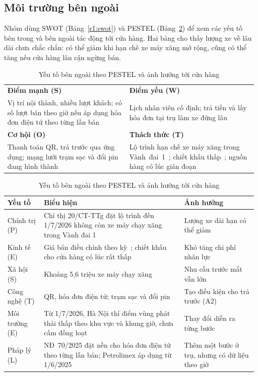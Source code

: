\subsection{Môi trường bên ngoài}
\label{r1:env}
\noindent
Nhóm dùng SWOT (Bảng~\ref{r1:swot}) và PESTEL (Bảng~\ref{r1:pestel}) để xem các yếu tố bên trong và bên ngoài tác động tới cửa hàng.
Hai bảng cho thấy lượng xe về lâu dài chưa chắc chắn: có thể giảm khi hạn chế xe máy xăng mở rộng, cũng có thể tăng nếu cửa hàng lân cận ngừng bán. 

\begin{table}[!htbp]\centering\small
\caption{SWOT của cửa hàng xăng nội thành}\label{r1:swot}
\begin{tabularx}{\linewidth}{@{}>{\raggedright\arraybackslash}X >{\raggedright\arraybackslash}X@{}}
\toprule
\textbf{Điểm mạnh (S)} & \textbf{Điểm yếu (W)} \\
Vị trí nội thành, nhiều lượt khách; có số lượt bán theo giờ nếu áp dụng hóa đơn điện tử theo từng lần bán~\cite{nd70} &
Lịch nhân viên cố định; trả tiền và lấy hóa đơn tại trụ làm xe đứng lâu \\
\midrule
\textbf{Cơ hội (O)} & \textbf{Thách thức (T)} \\
Thanh toán QR, trả trước qua ứng dụng; mạng lưới trạm sạc và đổi pin đang hình thành~\cite{vgx} &
Lộ trình hạn chế xe máy xăng trong Vành~đai~1~\cite{ct20,lez2026}; chiết khấu thấp~\cite{chietkhau}; nguồn hàng có lúc gián đoạn~\cite{vtc2026} \\
\bottomrule
\end{tabularx}
\vspace{1em}
\caption{Yếu tố bên ngoài theo PESTEL và ảnh hưởng tới cửa hàng}\label{r1:pestel}
\begin{tabularx}{\linewidth}{@{}p{24mm} >{\raggedright\arraybackslash}X >{\raggedright\arraybackslash}p{50mm}@{}}
\toprule
\textbf{Yếu tố} & \textbf{Biểu hiện} & \textbf{Ảnh hưởng} \\
\midrule
Chính trị (P) & Chỉ thị 20/CT-TTg đặt lộ trình đến 1/7/2026 không còn xe máy chạy xăng trong Vành đai 1~\cite{ct20} & Lượng xe dài hạn có thể giảm \\
Kinh tế (E) & Giá bán điều chỉnh theo kỳ~\cite{moit2026}; chiết khấu cho cửa hàng có lúc rất thấp~\cite{chietkhau} & Khó tăng chi phí nhân lực \\
Xã hội (S) & Khoảng 5,6 triệu xe máy chạy xăng~\cite{vnex2025} & Nhu cầu trước mắt vẫn lớn \\
Công nghệ (T) & QR, hóa đơn điện tử; trạm sạc và đổi pin~\cite{vgx} & Tạo điều kiện cho trả trước (A2) \\
Môi trường (E) & Từ 1/7/2026, Hà Nội thí điểm vùng phát thải thấp theo khu vực và khung giờ, chưa cấm đồng loạt~\cite{lez2026,tt2028} & Thay đổi diễn ra từng bước \\
Pháp lý (L) & NĐ~70/2025 đặt nền cho hóa đơn điện tử theo từng lần bán; Petrolimex áp dụng từ 1/6/2025~\cite{nd70} & Thêm một bước ở trụ, nhưng có dữ liệu theo giờ \\
\bottomrule
\end{tabularx}
\end{table}

